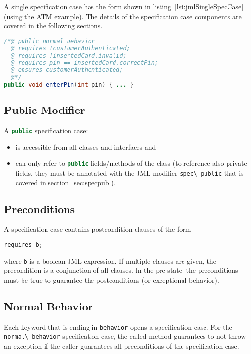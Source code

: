 \documentclass[a4paper, 11pt, accentcolor = tud3b]{tudreport}
\newcommand{\inlineJava}[1]{\lstinline[language = Java]|#1|}
\begin{document}
			A single specification case has the form shown in listing~\ref{lst:jmlSingleSpecCase} (using the ATM example). The details of the specification case components are covered in the following sections.
			
			\begin{lstlisting}[caption = { Single Specification Case in JML }, label = lst:jmlSingleSpecCase, language = Java]
/*@ public normal_behavior
  @ requires !customerAuthenticated;
  @ requires !insertedCard.invalid;
  @ requires pin == insertedCard.correctPin;
  @ ensures customerAuthenticated;
  @*/
public void enterPin(int pin) { ... }
			\end{lstlisting}

			\subsection{Public Modifier}
				A \inlineJava{public} specification case:
				\begin{itemize}
					\item is accessible from all classes and interfaces and
					\item can only refer to \inlineJava{public} fields/methods of the class (to reference also private fields, they must be annotated with the JML modifier \inlineJava{spec\_public} that is covered in section~\ref{sec:specpub}).
				\end{itemize}
			
			\subsection{Preconditions}
				\label{sec:precond}
			
				A specification case contains postcondition clauses of the form
				\begin{center}
					\inlineJava{requires b;}
				\end{center}
				where \texttt{b} is a boolean JML expression. If multiple clauses are given, the precondition is a conjunction of all clauses. In the pre-state, the preconditions must be true to guarantee the postconditions (or exceptional behavior).

			\subsection{Normal Behavior}
				Each keyword that is ending in \inlineJava{behavior} opens a specification case. For the \inlineJava{normal\_behavior} specification case, the called method guarantees to not throw an exception if the caller guarantees all preconditions of the specification case.
				
\end{document}
